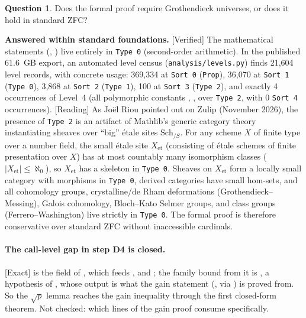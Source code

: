 \documentclass[11pt]{article}
\newcommand{\Exact}{\textcolor{exactc}{\textsf{\small[Exact]}}}
\newcommand{\Verified}{\textcolor{verc}{\textsf{\small[Verified]}}}
\newcommand{\Reading}{\textcolor{readc}{\textsf{\small[Reading]}}}
\theoremstyle{plain}
\theoremstyle{definition}
\newtheorem{question}{Question}
\begin{document}
\begin{question}
Does the formal proof require Grothendieck universes, or does it hold in standard ZFC?
\end{question}
\noindent\textbf{Answered within standard foundations.} \Verified{} The mathematical statements
(, ) live entirely in \texttt{Type 0} (second-order arithmetic).
In the published 61.6~GB export, an automated level census (\texttt{analysis/levels.py}) finds
21{,}604 level records, with concrete usage: 369{,}334 at \texttt{Sort 0} (\texttt{Prop}),
36{,}070 at \texttt{Sort 1} (\texttt{Type 0}), 3{,}868 at \texttt{Sort 2} (\texttt{Type 1}),
100 at \texttt{Sort 3} (\texttt{Type 2}), and exactly 4 occurrences of Level~4 (all polymorphic
constants , ,  over \texttt{Type 2}, with 0
\texttt{Sort 4} occurrences). \Reading{} As Jo\"el Riou pointed out on Zulip (November 2026),
the presence of \texttt{Type 2} is an artifact of Mathlib's generic category theory instantiating
sheaves over ``big'' \'etale sites $\mathrm{Sch}_{/S}$. For any scheme $X$ of finite type over a
number field, the small \'etale site $X_\mathrm{et}$ (consisting of \'etale schemes of finite
presentation over $X$) has at most countably many isomorphism classes ($|X_\mathrm{et}|\le\aleph_0$),
so $X_\mathrm{et}$ has a skeleton in \texttt{Type 0}. Sheaves on $X_\mathrm{et}$ form a locally small
category with morphisms in \texttt{Type 0}, derived categories have small hom-sets, and all
cohomology groups, crystalline/de Rham deformations (Grothendieck--Messing), Galois cohomology,
Bloch--Kato Selmer groups, and class groups (Ferrero--Washington) live strictly in \texttt{Type 0}.
The formal proof is therefore conservative over standard ZFC without inaccessible cardinals.

\paragraph{The call-level gap in step D4 is closed.} \Exact{}  is the
field  of , which feeds ,
 and ; the family bound
from it is , a hypothesis of , whose output is what the
gain statement (, via ) is proved from. So the $\sqrt p$
lemma reaches the gain inequality through the first closed-form theorem. Not checked: which lines of
the gain proof consume  specifically.
\end{document}
